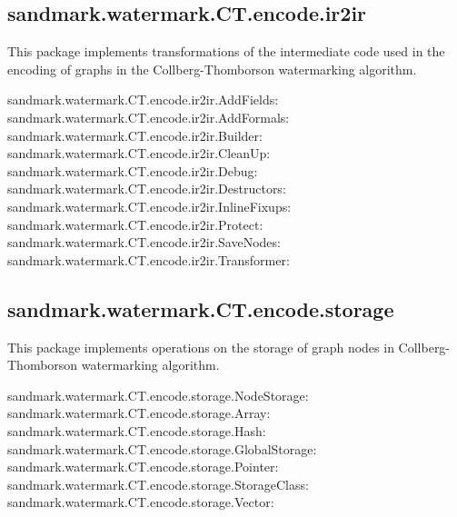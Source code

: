 \subsection{sandmark.watermark.CT.encode.ir2ir}
This package implements transformations 
of the intermediate code used in the encoding
of graphs in the Collberg-Thomborson watermarking algorithm.
\begin{description}
   \item[sandmark.watermark.CT.encode.ir2ir.AddFields:]
   \item[sandmark.watermark.CT.encode.ir2ir.AddFormals:]
   \item[sandmark.watermark.CT.encode.ir2ir.Builder:]
   \item[sandmark.watermark.CT.encode.ir2ir.CleanUp:]
   \item[sandmark.watermark.CT.encode.ir2ir.Debug:]
   \item[sandmark.watermark.CT.encode.ir2ir.Destructors:]
   \item[sandmark.watermark.CT.encode.ir2ir.InlineFixups:]
   \item[sandmark.watermark.CT.encode.ir2ir.Protect:]
   \item[sandmark.watermark.CT.encode.ir2ir.SaveNodes:]
   \item[sandmark.watermark.CT.encode.ir2ir.Transformer:]
\end{description}

\subsection{sandmark.watermark.CT.encode.storage}
This package implements operations on
the storage of graph nodes in 
Collberg-Thomborson watermarking algorithm.
\begin{description}
   \item[sandmark.watermark.CT.encode.storage.NodeStorage:]
   \item[sandmark.watermark.CT.encode.storage.Array:]
   \item[sandmark.watermark.CT.encode.storage.Hash:]
   \item[sandmark.watermark.CT.encode.storage.GlobalStorage:]
   \item[sandmark.watermark.CT.encode.storage.Pointer:]
   \item[sandmark.watermark.CT.encode.storage.StorageClass:]
   \item[sandmark.watermark.CT.encode.storage.Vector:]
\end{description}

